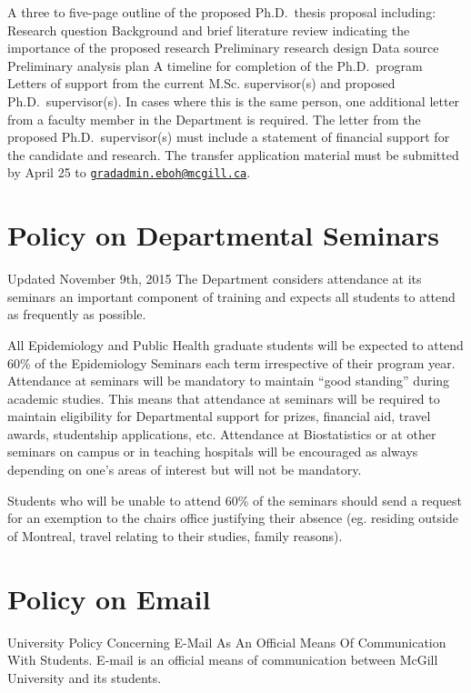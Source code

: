 \documentclass[
]{book}
\begin{document}
A three to five-page outline of the proposed Ph.D.~thesis proposal including:
Research question
Background and brief literature review indicating the importance of the proposed research
Preliminary research design
Data source
Preliminary analysis plan
A timeline for completion of the Ph.D.~program
Letters of support from the current M.Sc. supervisor(s) and proposed Ph.D.~supervisor(s). In cases where this is the same person, one additional letter from a faculty member in the Department is required. The letter from the proposed Ph.D.~supervisor(s) must include a statement of financial support for the candidate and research.
The transfer application material must be submitted by April 25 to \href{mailto:gradadmin.eboh@mcgill.ca}{\nolinkurl{gradadmin.eboh@mcgill.ca}}.

\hypertarget{policy-on-departmental-seminars}{%
\section{Policy on Departmental Seminars}\label{policy-on-departmental-seminars}}

Updated November 9th, 2015
The Department considers attendance at its seminars an important component of training and expects all students to attend as frequently as possible.

All Epidemiology and Public Health graduate students will be expected to attend 60\% of the Epidemiology Seminars each term irrespective of their program year. Attendance at seminars will be mandatory to maintain ``good standing'' during academic studies. This means that attendance at seminars will be required to maintain eligibility for Departmental support for prizes, financial aid, travel awards, studentship applications, etc. Attendance at Biostatistics or at other seminars on campus or in teaching hospitals will be encouraged as always depending on one's areas of interest but will not be mandatory.

Students who will be unable to attend 60\% of the seminars should send a request for an exemption to the chairs office justifying their absence (eg. residing outside of Montreal, travel relating to their studies, family reasons).

\hypertarget{policy-on-email}{%
\section{Policy on Email}\label{policy-on-email}}

University Policy Concerning E-Mail As An Official Means Of Communication With Students. E-mail is an official means of communication between McGill University and its students.
\end{document}
